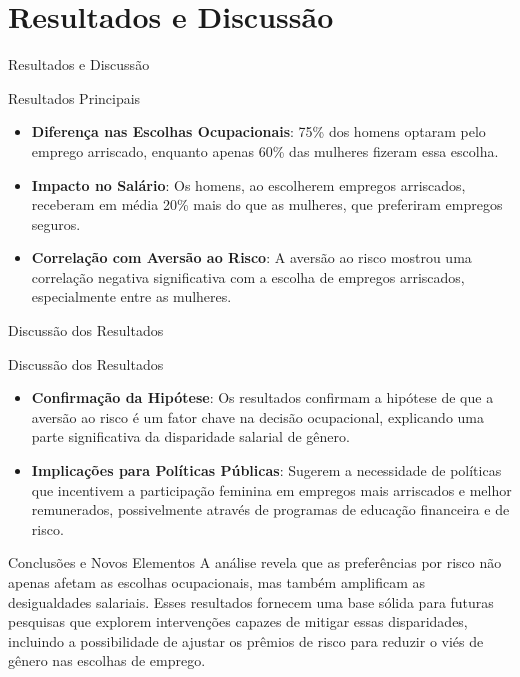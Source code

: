 \documentclass[aspectratio=169, xcolor={dvipsnames}, 10pt, brazil]{beamer}
\begin{document}
\section{Resultados e Discussão}
\begin{frame}{Resultados e Discussão}
    \begin{block}{Resultados Principais}
        \begin{itemize}
            \item \textbf{Diferença nas Escolhas Ocupacionais}: 75\% dos homens optaram pelo emprego arriscado, enquanto apenas 60\% das mulheres fizeram essa escolha.
            \item \textbf{Impacto no Salário}: Os homens, ao escolherem empregos arriscados, receberam em média 20\% mais do que as mulheres, que preferiram empregos seguros.
            \item \textbf{Correlação com Aversão ao Risco}: A aversão ao risco mostrou uma correlação negativa significativa com a escolha de empregos arriscados, especialmente entre as mulheres.
        \end{itemize}
    \end{block}
\end{frame}

\begin{frame}{Discussão dos Resultados}
    \begin{block}{Discussão dos Resultados}
        \begin{itemize}
            \item \textbf{Confirmação da Hipótese}: Os resultados confirmam a hipótese de que a aversão ao risco é um fator chave na decisão ocupacional, explicando uma parte significativa da disparidade salarial de gênero.
            \item \textbf{Implicações para Políticas Públicas}: Sugerem a necessidade de políticas que incentivem a participação feminina em empregos mais arriscados e melhor remunerados, possivelmente através de programas de educação financeira e de risco.
        \end{itemize}
    \end{block}
    
    \vspace{0.5cm}
    
    \begin{block}{Conclusões e Novos Elementos}
        A análise revela que as preferências por risco não apenas afetam as escolhas ocupacionais, mas também amplificam as desigualdades salariais. Esses resultados fornecem uma base sólida para futuras pesquisas que explorem intervenções capazes de mitigar essas disparidades, incluindo a possibilidade de ajustar os prêmios de risco para reduzir o viés de gênero nas escolhas de emprego.
    \end{block}
\end{frame}
\end{document}
